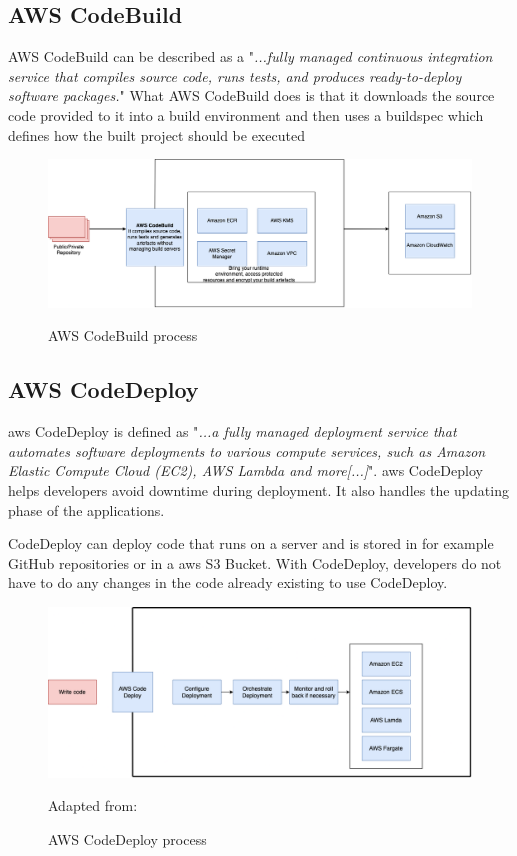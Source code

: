 \subsection{AWS CodeBuild }
AWS CodeBuild can be described as a "\textit{...fully managed continuous integration service that compiles source code, runs tests, and produces ready-to-deploy software packages.}"
\cite{AWSCodeBuild}
What AWS CodeBuild does is that it downloads the source code provided to it into a build environment and then uses a \Gls{buildspec} which defines how the built project should be executed\cite{AWSCodeBuild1}
\begin{figure}[H]
    \centering
    \includegraphics[scale=0.4]{Images/CodeBuild.png}
    \caption{AWS CodeBuild process}\cite{AWSCodeBuild}
    \label{fig: AWS CodeBuild Process}
\end{figure}

\subsection{AWS CodeDeploy}
\acrshort{aws} CodeDeploy is defined as "\textit{...a fully managed deployment service that automates software deployments to various compute services, such as Amazon Elastic Compute Cloud (EC2), AWS Lambda and more[...]}"\cite{AWSCodeDeploy}.
\acrshort{aws} CodeDeploy helps developers avoid downtime during deployment. It also handles the updating phase of the applications. 

CodeDeploy can deploy code that runs on a server and is stored in for example GitHub repositories or in a \acrshort{aws} S3 Bucket. With CodeDeploy, developers do not have to do any changes in the code already existing to use CodeDeploy. \cite{CodeDeploy1}

\begin{figure}[H]
    \centering
    \includegraphics[scale=0.4]{Images/AWSCodeDeploy.png}
    \caption{AWS CodeDeploy process} Adapted from: \cite{CodeDeploy1}
    \label{fig:AWS CodeDeploy Process}
\end{figure}


